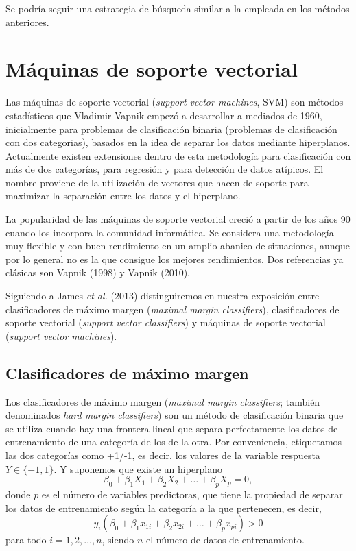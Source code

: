 \documentclass[
]{book}
\theoremstyle{break}
\theoremstyle{definition}
\theoremstyle{definition}
\theoremstyle{definition}
\theoremstyle{remark}
\begin{document}
Se podría seguir una estrategia de búsqueda similar a la empleada en los métodos anteriores.

\hypertarget{svm}{%
\chapter{Máquinas de soporte vectorial}\label{svm}}

Las máquinas de soporte vectorial (\emph{support vector machines}, SVM) son métodos estadísticos que Vladimir Vapnik empezó a desarrollar a mediados de 1960, inicialmente para problemas de clasificación binaria (problemas de clasificación con dos categorias), basados en la idea de separar los datos mediante hiperplanos. Actualmente existen extensiones dentro de esta metodología para clasificación con más de dos categorías, para regresión y para detección de datos atípicos. El nombre proviene de la utilización de vectores que hacen de soporte para maximizar la separación entre los datos y el hiperplano.

La popularidad de las máquinas de soporte vectorial creció a partir de los años 90 cuando los incorpora la comunidad informática. Se considera una metodología muy flexible y con buen rendimiento en un amplio abanico de situaciones, aunque por lo general no es la que consigue los mejores rendimientos. Dos referencias ya clásicas son Vapnik (1998) y Vapnik (2010).

Siguiendo a James \emph{et al.} (2013) distinguiremos en nuestra exposición entre clasificadores de máximo margen (\emph{maximal margin classifiers}), clasificadores de soporte vectorial (\emph{support vector classifiers}) y máquinas de soporte vectorial (\emph{support vector machines}).

\hypertarget{clasificadores-de-muxe1ximo-margen}{%
\section{Clasificadores de máximo margen}\label{clasificadores-de-muxe1ximo-margen}}

Los clasificadores de máximo margen (\emph{maximal margin classifiers}; también denominados \emph{hard margin classifiers}) son un método de clasificación binaria que se utiliza cuando hay una frontera lineal que separa perfectamente los datos de entrenamiento de una categoría de los de la otra. Por conveniencia, etiquetamos las dos categorías como +1/-1, es decir, los valores de la variable respuesta \(Y \in \{-1, 1\}\). Y suponemos que existe un hiperplano
\[ \beta_0 + \beta_1 X_1 + \beta_2 X_2 + \ldots + \beta_p X_p = 0,\]
donde \(p\) es el número de variables predictoras, que tiene la propiedad de separar los datos de entrenamiento según la categoría a la que pertenecen, es decir,
\[ y_i(\beta_0 + \beta_1 x_{1i} + \beta_2 x_{2i} + \ldots + \beta_p x_{pi}) > 0\]
para todo \(i = 1, 2, \ldots, n\), siendo \(n\) el número de datos de entrenamiento.
\end{document}
